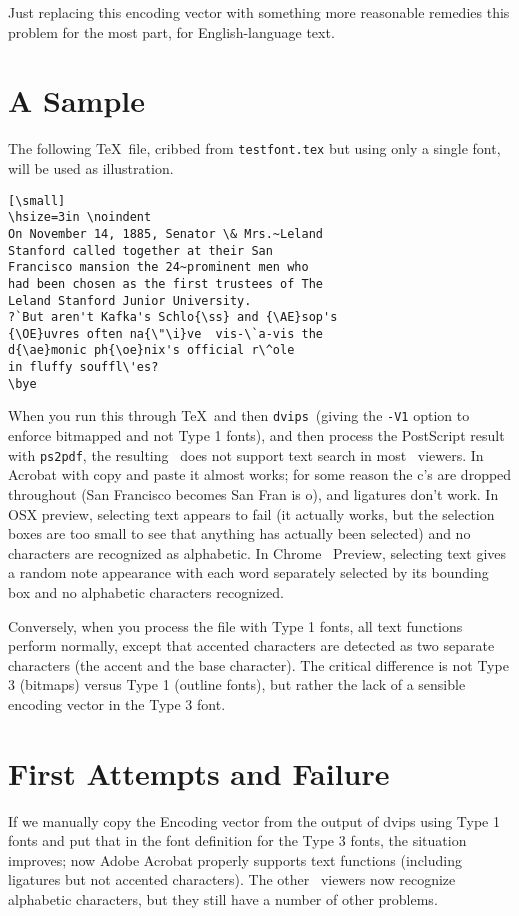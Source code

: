 \documentclass{ltugboat}
\def\PDF{\acro{PDF}}
\def\dvips{\texttt{dvips}}
\def\ps2pdf{\texttt{ps2pdf}}
\begin{document}
Just replacing this encoding vector with something more
reasonable remedies this problem for the most part, for
English-language text.

\section{A Sample}

The following \TeX\ file, cribbed from \texttt{testfont.tex}
but using only a single font, will be used as illustration.

\begin{verbatim}[\small]
\hsize=3in \noindent
On November 14, 1885, Senator \& Mrs.~Leland
Stanford called together at their San
Francisco mansion the 24~prominent men who
had been chosen as the first trustees of The
Leland Stanford Junior University.
?`But aren't Kafka's Schlo{\ss} and {\AE}sop's
{\OE}uvres often na{\"\i}ve  vis-\`a-vis the
d{\ae}monic ph{\oe}nix's official r\^ole
in fluffy souffl\'es?
\bye
\end{verbatim}
\noindent
When you run this through \TeX\ and then \dvips\
(giving the \texttt{-V1} option to enforce bitmapped
and not Type 1 fonts), and then process the PostScript
result with \ps2pdf, the resulting \PDF\ does not
support text search in most \PDF\ viewers.  In Acrobat
with copy and paste it almost works; for some reason
the c's are dropped throughout (San Francisco becomes
San Fran is o), and ligatures don't work.  In OSX
preview, selecting text appears to fail (it
actually works, but the selection boxes are too small
to see that anything has actually been selected) and
no characters are recognized as alphabetic.  In Chrome
\PDF\ Preview, selecting text gives a random note
appearance with each word separately selected by its
bounding box and no alphabetic characters recognized.

Conversely, when you process the file with Type 1
fonts, all text functions perform normally, except that
accented characters are detected as two separate
characters (the accent and the base character).  The
critical difference is not Type 3 (bitmaps) versus
Type 1 (outline fonts), but rather the lack of a
sensible encoding vector in the Type 3 font.

\section{First Attempts and Failure}

If we manually copy the Encoding vector from
the output of dvips using Type 1 fonts and put that
in the font definition for the Type 3 fonts, the situation
improves; now Adobe Acrobat properly supports text
functions (including ligatures but not accented
characters).  The other \PDF\ viewers now recognize
alphabetic characters, but they still have a number of
other problems.
\end{document}

